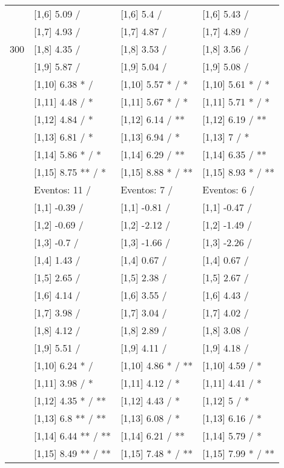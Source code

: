 \begin{table}
\begin{tabular}[t]{llll}
 & {}[1,6] 5.09  / & {}[1,6] 5.4  / & {}[1,6] 5.43  /\\
 & {}[1,7] 4.93  / & {}[1,7] 4.87  / & {}[1,7] 4.89  /\\
300 & {}[1,8] 4.35  / & {}[1,8] 3.53  / & {}[1,8] 3.56  /\\
\addlinespace
 & {}[1,9] 5.87  / & {}[1,9] 5.04  / & {}[1,9] 5.08  /\\
 & {}[1,10] 6.38 * / & {}[1,10] 5.57 * / * & {}[1,10] 5.61 * / *\\
 & {}[1,11] 4.48  / * & {}[1,11] 5.67 * / * & {}[1,11] 5.71 * / *\\
 & {}[1,12] 4.84  / * & {}[1,12] 6.14  / ** & {}[1,12] 6.19  / **\\
 & {}[1,13] 6.81  / * & {}[1,13] 6.94  / * & {}[1,13] 7  / *\\
\addlinespace
 & {}[1,14] 5.86 * / * & {}[1,14] 6.29  / ** & {}[1,14] 6.35  / **\\
 & {}[1,15] 8.75 ** / * & {}[1,15] 8.88 * / ** & {}[1,15] 8.93 * / **\\
 & Eventos:  11 / & Eventos:  7 / & Eventos:  6 /\\
 & {}[1,1] -0.39  / & {}[1,1] -0.81  / & {}[1,1] -0.47  /\\
 & {}[1,2] -0.69  / & {}[1,2] -2.12  / & {}[1,2] -1.49  /\\
\addlinespace
 & {}[1,3] -0.7  / & {}[1,3] -1.66  / & {}[1,3] -2.26  /\\
 & {}[1,4] 1.43  / & {}[1,4] 0.67  / & {}[1,4] 0.67  /\\
 & {}[1,5] 2.65  / & {}[1,5] 2.38  / & {}[1,5] 2.67  /\\
 & {}[1,6] 4.14  / & {}[1,6] 3.55  / & {}[1,6] 4.43  /\\
 & {}[1,7] 3.98  / & {}[1,7] 3.04  / & {}[1,7] 4.02  /\\
\addlinespace
500 & {}[1,8] 4.12  / & {}[1,8] 2.89  / & {}[1,8] 3.08  /\\
 & {}[1,9] 5.51  / & {}[1,9] 4.11  / & {}[1,9] 4.18  /\\
 & {}[1,10] 6.24 * / & {}[1,10] 4.86 * / ** & {}[1,10] 4.59  / *\\
 & {}[1,11] 3.98  / * & {}[1,11] 4.12  / * & {}[1,11] 4.41  / *\\
 & {}[1,12] 4.35 * / ** & {}[1,12] 4.43  / * & {}[1,12] 5  / *\\
\addlinespace
 & {}[1,13] 6.8 ** / ** & {}[1,13] 6.08  / * & {}[1,13] 6.16  / *\\
 & {}[1,14] 6.44 ** / ** & {}[1,14] 6.21  / ** & {}[1,14] 5.79  / *\\
 & {}[1,15] 8.49 ** / ** & {}[1,15] 7.48 * / ** & {}[1,15] 7.99 * / **\\
\bottomrule
\end{tabular}
\end{table}
